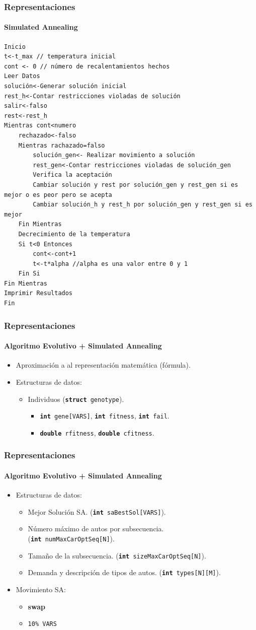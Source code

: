\begin{frame}[fragile]
\frametitle{Representaciones}
\framesubtitle{Simulated Annealing}
\tiny{
\begin{verbatim}
Inicio
t<-t_max // temperatura inicial
cont <- 0 // número de recalentamientos hechos
Leer Datos
solución<-Generar solución inicial
rest_h<-Contar restricciones violadas de solución
salir<-falso
rest<-rest_h
Mientras cont<numero
    rechazado<-falso
    Mientras rachazado=falso
        solución_gen<- Realizar movimiento a solución
        rest_gen<-Contar restricciones violadas de solución_gen
       	Verifica la aceptación
		Cambiar solución y rest por solución_gen y rest_gen si es mejor o es peor pero se acepta
        Cambiar solución_h y rest_h por solución_gen y rest_gen si es mejor
    Fin Mientras
    Decrecimiento de la temperatura   
    Si t<0 Entonces
        cont<-cont+1
        t<-t*alpha //alpha es una valor entre 0 y 1
    Fin Si
Fin Mientras
Imprimir Resultados
Fin
\end{verbatim}
}
\normalsize
\end{frame}

\frame
{
\frametitle{Representaciones}
\framesubtitle{Algoritmo Evolutivo + Simulated Annealing}
\begin{itemize}
	\item Aproximación a al representación matemática (fórmula).
	\item Estructuras de datos:
	\begin{itemize}
		\item Individuos (\texttt{{\bf struct} genotype}).
		\begin{itemize}
			\item {\tt{\bf int} gene[VARS]}, {\tt {\bf int} fitness}, {\tt {\bf int} fail}.
			\item {\tt {\bf double} rfitness}, {\tt {\bf double} cfitness}.
		\end{itemize}
	\end{itemize}
\end{itemize}
}

\frame
{
\frametitle{Representaciones}
\framesubtitle{Algoritmo Evolutivo + Simulated Annealing}
\begin{itemize}
	\item Estructuras de datos:
	\begin{itemize}
		\item Mejor Solución SA. ({\tt {\bf int} saBestSol[VARS]}).
		\item Número máximo de autos por subsecuencia.\\({\tt {\bf int} numMaxCarOptSeq[N]}).
		\item Tamaño de la subsecuencia. ({\tt {\bf int} sizeMaxCarOptSeq[N]}).
		\item Demanda y descripción de tipos de autos. ({\tt {\bf int} types[N][M]}).
	\end{itemize}
	\item Movimiento SA:
	\begin{itemize}
		\item {\bf swap}
		\item {\tt 10\% VARS}
	\end{itemize}
\end{itemize}
}

